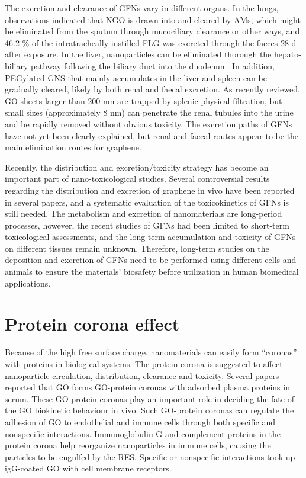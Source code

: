 \documentclass[twoside,twocolumn,9pt]{article}
\begin{document}
The excretion and clearance of GFNs vary in different organs. In the lungs, observations indicated that NGO is drawn into and cleared by AMs, which might be eliminated from the sputum through mucociliary clearance or other ways, and 46.2 \% of the intratracheally instilled FLG was excreted through the faeces 28 d after exposure. In the liver, nanoparticles can be eliminated thorough the hepato-biliary pathway following the biliary duct into the duodenum. In addition, PEGylated GNS that mainly accumulates in the liver and spleen can be gradually cleared, likely by both renal and faecal excretion. As recently reviewed, GO sheets larger than 200 nm are trapped by splenic physical filtration, but small sizes (approximately 8 nm) can penetrate the renal tubules into the urine and be rapidly removed without obvious toxicity. The excretion paths of GFNs have not yet been clearly explained, but renal and faecal routes appear to be the main elimination routes for graphene.

Recently, the distribution and excretion/toxicity strategy has become an important part of nano-toxicological studies. Several controversial results regarding the distribution and excretion of graphene in vivo have been reported in several papers, and a systematic evaluation of the toxicokinetics of GFNs is still needed. The metabolism and excretion of nanomaterials are long-period processes, however, the recent studies of GFNs had been limited to short-term toxicological assessments, and the long-term accumulation and toxicity of GFNs on different tissues remain unknown. Therefore, long-term studies on the deposition and excretion of GFNs need to be performed using different cells and animals to ensure the materials’ biosafety before utilization in human biomedical applications.

\section{Protein corona effect} Because of the high free surface charge, nanomaterials can easily form “coronas” with proteins in biological systems. The protein corona is suggested to affect nanoparticle circulation, distribution, clearance and toxicity. Several papers reported that GO forms GO-protein coronas with adsorbed plasma proteins in serum. These GO-protein coronas play an important role in deciding the fate of the GO biokinetic behaviour in vivo. Such GO-protein coronas can regulate the adhesion of GO to endothelial and immune cells through both specific and nonspecific interactions. Immunoglobulin G and complement proteins in the protein corona help reorganize nanoparticles in immune cells, causing the particles to be engulfed by the RES. Specific or nonspecific interactions took up igG-coated GO with cell membrane receptors.
\end{document}

